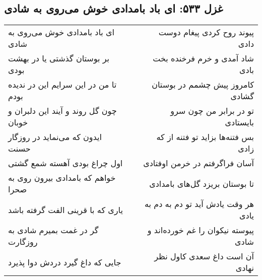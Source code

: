 \begin{center}
\section*{غزل ۵۳۳: ای باد بامدادی خوش می‌روی به شادی}
\label{sec:533}
\begin{longtable}{l p{0.5cm} r}
ای باد بامدادی خوش می‌روی به شادی
&&
پیوند روح کردی پیغام دوست دادی
\\
بر بوستان گذشتی یا در بهشت بودی
&&
شاد آمدی و خرم فرخنده بخت بادی
\\
تا من در این سرایم این در ندیده بودم
&&
کامروز پیش چشمم در بوستان گشادی
\\
چون گل روند و آیند این دلبران و خوبان
&&
تو در برابر من چون سرو بایستادی
\\
ایدون که می‌نماید در روزگار حسنت
&&
بس فتنه‌ها بزاید تو فتنه از که زادی
\\
اول چراغ بودی آهسته شمع گشتی
&&
آسان فراگرفتم در خرمن اوفتادی
\\
خواهم که بامدادی بیرون روی به صحرا
&&
تا بوستان بریزد گل‌های بامدادی
\\
یاری که با قرینی الفت گرفته باشد
&&
هر وقت یادش آید تو دم به دم به یادی
\\
گر در غمت بمیرم شادی به روزگارت
&&
پیوسته نیکوان را غم خورده‌اند و شادی
\\
جایی که داغ گیرد دردش دوا پذیرد
&&
آن است داغ سعدی کاول نظر نهادی
\\
\end{longtable}
\end{center}
